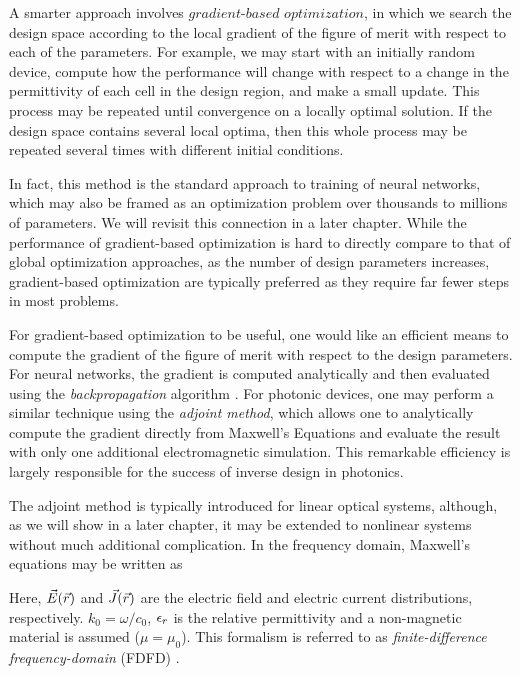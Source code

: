 A smarter approach involves $\textit{gradient-based optimization}$, in which we search the design space according to the local gradient of the figure of merit with respect to each of the parameters.
For example, we may start with an initially random device, compute how the performance will change with respect to a change in the permittivity of each cell in the design region, and make a small update.
This process may be repeated until convergence on a locally optimal solution.
If the design space contains several local optima, then this whole process may be repeated several times with different initial conditions.

In fact, this method is the standard approach to training of neural networks, which may also be framed as an optimization problem over thousands to millions of parameters.
We will revisit this connection in a later chapter.
While the performance of gradient-based optimization is hard to directly compare to that of global optimization approaches, as the number of design parameters increases, gradient-based optimization are typically preferred as they require far fewer steps in most problems.

For gradient-based optimization to be useful, one would like an efficient means to compute the gradient of the figure of merit with respect to the design parameters.
For neural networks, the gradient is computed analytically and then evaluated using the \textit{backpropagation} algorithm \cite{rumelhart_learning_1985}.
For photonic devices, one may perform a similar technique using the \textit{adjoint method}, which allows one to analytically compute the gradient directly from Maxwell's Equations and evaluate the result with only one additional electromagnetic simulation.
This remarkable efficiency is largely responsible for the success of inverse design in photonics.

The adjoint method is typically introduced for linear optical systems, although, as we will show in a later chapter, it may be extended to nonlinear systems without much additional complication.
In the frequency domain, Maxwell's equations may be written as

%
Here, $\vec{E}(\vec{r})$ and $\vec{J}(\vec{r})$ are the electric field and electric current distributions, respectively. $k_0 = \omega/c_0$, $\epsilon_r$ is the relative permittivity and a non-magnetic material is assumed ($\mu = \mu_0$).
This formalism is referred to as \textit{finite-difference frequency-domain} (FDFD) \cite{shin2012choice, taflove2000computational}.

